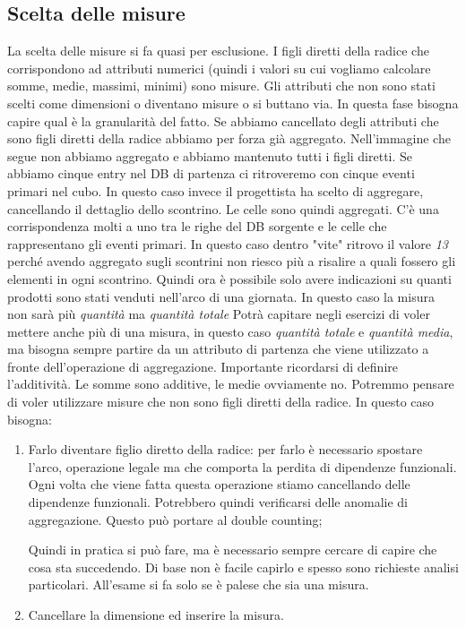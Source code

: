 \subsection{Scelta delle misure}
La scelta delle misure si fa quasi per esclusione. I figli diretti della radice che corrispondono ad attributi numerici (quindi i valori su cui vogliamo calcolare somme, medie, massimi, minimi) sono misure. Gli attributi che non sono stati scelti come dimensioni o diventano misure o si buttano via. In questa fase bisogna capire qual è la granularità del fatto. Se abbiamo cancellato degli attributi che sono figli diretti della radice abbiamo per forza già aggregato.\newline
\noindent Nell'immagine che segue non abbiamo aggregato e abbiamo mantenuto tutti i figli diretti. Se abbiamo cinque entry nel DB di partenza ci ritroveremo con cinque eventi primari nel cubo.
\noindent In questo caso invece il progettista ha scelto di aggregare, cancellando il dettaglio dello scontrino. Le celle sono quindi aggregati. C'è una corrispondenza molti a uno tra le righe del DB sorgente e le celle che rappresentano gli eventi primari. In questo caso dentro "vite" ritrovo il valore \textit{13} perché avendo aggregato sugli scontrini non riesco più a risalire a quali fossero gli elementi in ogni scontrino. Quindi ora è possibile solo avere indicazioni su quanti prodotti sono stati venduti nell'arco di una giornata.\newline
In questo caso la misura non sarà più \textit{quantità} ma \textit{quantità totale}
\noindent Potrà capitare negli esercizi di voler mettere anche più di una misura, in questo caso \textit{quantità totale} e \textit{quantità media}, ma bisogna sempre partire da un attributo di partenza che viene utilizzato a fronte dell'operazione di aggregazione. Importante ricordarsi di definire l'additività. Le somme sono additive, le medie ovviamente no.\newline
Potremmo pensare di voler utilizzare misure che non sono figli diretti della radice. In questo caso bisogna:
\begin{enumerate}
	\item Farlo diventare figlio diretto della radice: per farlo è necessario spostare l'arco, operazione legale ma che comporta la perdita di dipendenze funzionali. Ogni volta che viene fatta questa operazione stiamo cancellando delle dipendenze funzionali. Potrebbero quindi verificarsi delle anomalie di aggregazione. Questo può portare al double counting;
	\begin{warn}
		Quindi in pratica si può fare, ma è necessario sempre cercare di capire che cosa sta succedendo. Di base non è facile capirlo e spesso sono richieste analisi particolari. All'esame si fa solo se è palese che sia una misura.
	\end{warn}
	\item Cancellare la dimensione ed inserire la misura.
\end{enumerate}
